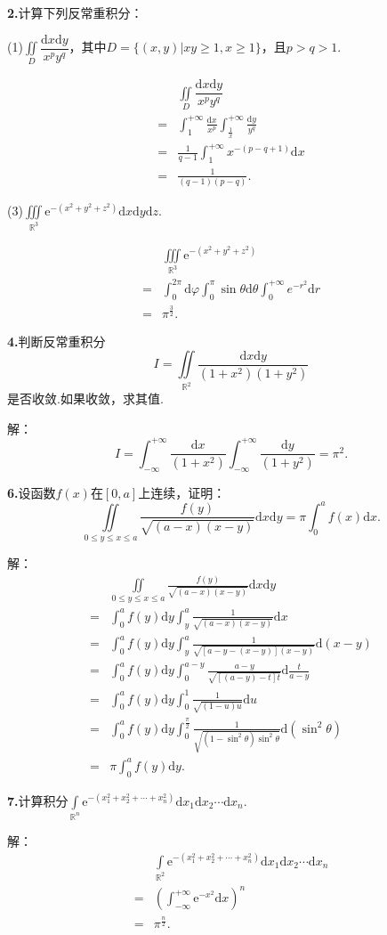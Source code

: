\documentclass[12pt, a4paper]{article}
\newcommand{\RR}{\mathbb{R}}
\newcommand{\e}{\mathrm{e}}
\newcommand{\dif}{\mathrm{d}}
\begin{document}
\textbf{2.}计算下列反常重积分：

(1)\(\iint\limits_D \dfrac{\dif x \dif y}{x^py^q}\)，其中\(D = \{(x, y)|xy \geq 1, x \geq 1\}\)，且\(p > q > 1\).

\begin{align*}
&\iint\limits_D \dfrac{\dif x \dif y}{x^py^q} \\
= &\int_{1}^{+\infty} \frac{\dif x}{x^p} \int_{\frac{1}{x}}^{+\infty} \frac{\dif y}{y^q} \\
= &\frac{1}{q - 1} \int_{1}^{+\infty} x^{-(p - q + 1)} \dif x \\
= &\frac{1}{(q - 1)(p - q)}.
\end{align*}

(3)\(\iiint\limits_{\RR^3} \e^{-(x^2 + y^2 + z^2)} \dif x \dif y \dif z\).

\begin{align*}
&\iiint\limits_{\RR^3} \e^{-(x^2 + y^2 + z^2)} \\
= &\int_{0}^{2\pi} \dif \varphi \int_0^\pi \sin\theta \dif \theta \int_{0}^{+\infty} e^{-r^2} \dif r \\
= &\pi^{\frac{3}{2}}.
\end{align*}

\textbf{4.}判断反常重积分
\[I = \iint\limits_{\RR^2} \frac{\dif x \dif y}{(1 + x^2)(1 + y^2)}\]
是否收敛.如果收敛，求其值.

解：
\[I = \int_{-\infty}^{+\infty} \frac{\dif x}{(1 + x^2)} \int_{-\infty}^{+\infty} \frac{\dif y}{(1 + y^2)} = \pi^2.\]

\textbf{6.}设函数\(f(x)\)在\([0, a]\)上连续，证明：
\[\iint\limits_{0 \leq y \leq x \leq a} \frac{f(y)}{\sqrt{(a - x)(x - y)}} \dif x \dif y = \pi \int_0^a f(x) \dif x.\]

解：
\begin{align*}
&\iint\limits_{0 \leq y \leq x \leq a} \frac{f(y)}{\sqrt{(a - x)(x - y)}} \dif x \dif y \\
= &\int_0^a f(y) \dif y \int_y^a \frac{1}{\sqrt{(a - x)(x - y)}} \dif x \\
= &\int_0^a f(y) \dif y \int_y^a \frac{1}{\sqrt{[a - y - (x - y)](x - y)}} \dif (x - y) \\
= &\int_0^a f(y) \dif y \int_{0}^{a - y} \frac{a - y}{\sqrt{[(a - y) - t]t}} \dif \frac{t}{a - y} \\
= &\int_0^a f(y) \dif y \int_0^1 \frac{1}{\sqrt{(1 - u)u}} \dif u \\
= &\int_0^a f(y) \dif y \int_{0}^{\frac{\pi}{2}} \frac{1}{\sqrt{(1 - \sin^2\theta)\sin^2\theta}} \dif (\sin^2\theta) \\
= &\pi\int_0^a f(y) \dif y.
\end{align*}

\textbf{7.}计算积分\(\int\limits_{\RR^n} \e^{-(x_1^2 + x_2^2 + \cdots + x_n^2)} \dif x_1 \dif x_2 \cdots \dif x_n\).

解：
\begin{align*}
&\int\limits_{\RR^2} \e^{-(x_1^2 + x_2^2 + \cdots + x_n^2)} \dif x_1 \dif x_2 \cdots \dif x_n \\
= &\left(\int_{-\infty}^{+\infty} \e^{-x^2} \dif x\right)^n \\
= &\pi^{\frac{n}{2}}.
\end{align*}
\end{document}
